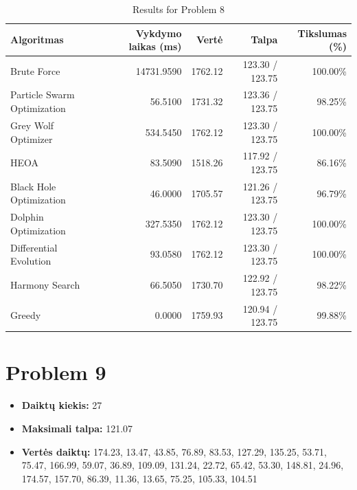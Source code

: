 \documentclass[a4paper,11pt]{article}
\begin{document}
\begin{table}[h!]
\centering
\begin{tabular}{lrrrr}
\toprule
\textbf{Algoritmas} & \textbf{Vykdymo laikas (ms)} & \textbf{Vertė} & \textbf{Talpa} & \textbf{Tikslumas (\%)} \\
\midrule
Brute Force & 14731.9590 & 1762.12 & 123.30 / 123.75 & 100.00\% \\
Particle Swarm Optimization & 56.5100 & 1731.32 & 123.36 / 123.75 & 98.25\% \\
Grey Wolf Optimizer & 534.5450 & 1762.12 & 123.30 / 123.75 & 100.00\% \\
HEOA & 83.5090 & 1518.26 & 117.92 / 123.75 & 86.16\% \\
Black Hole Optimization & 46.0000 & 1705.57 & 121.26 / 123.75 & 96.79\% \\
Dolphin Optimization & 327.5350 & 1762.12 & 123.30 / 123.75 & 100.00\% \\
Differential Evolution & 93.0580 & 1762.12 & 123.30 / 123.75 & 100.00\% \\
Harmony Search & 66.5050 & 1730.70 & 122.92 / 123.75 & 98.22\% \\
Greedy & 0.0000 & 1759.93 & 120.94 / 123.75 & 99.88\% \\
\bottomrule
\end{tabular}
\caption{Results for Problem 8}
\end{table}
\clearpage

\section*{Problem 9}
\begin{itemize}
    \item \textbf{Daiktų kiekis:} 27
    \item \textbf{Maksimali talpa:} 121.07
    \item \textbf{Vertės daiktų:} 174.23, 13.47, 43.85, 76.89, 83.53, 127.29, 135.25, 53.71, 75.47, 166.99, 59.07, 36.89, 109.09, 131.24, 22.72, 65.42, 53.30, 148.81, 24.96, 174.57, 157.70, 86.39, 11.36, 13.65, 75.25, 105.33, 104.51
\end{itemize}
\end{document}
